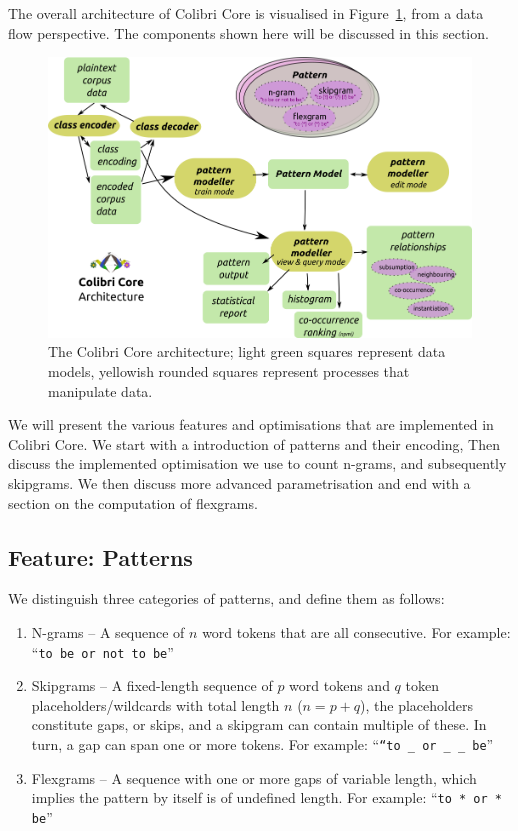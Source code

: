 The overall architecture of Colibri Core is visualised in
Figure~\ref{fig:architecture}, from a data flow perspective.  The components
shown here will be discussed in this section.

\begin{figure}[h]
\includegraphics[width=14.0cm]{../cocoarch.png}
\caption{The Colibri Core architecture; light green squares represent data models, yellowish rounded squares represent processes that manipulate data.}
\label{fig:architecture}
\end{figure}

We will present the various features and optimisations that are implemented in
Colibri Core. We start with a introduction of patterns and their encoding, Then
discuss the implemented optimisation we use to count n-grams, and subsequently
skipgrams. We then discuss more advanced parametrisation and end with a section
on the computation of flexgrams.

\subsection*{Feature: Patterns}
\label{sec:patterns}

We distinguish three categories of patterns, and define them as follows:

\begin{enumerate}
    \item N-grams -- A sequence of $n$ word tokens that are all consecutive.
        For example: ``\texttt{to be or not to be}''
    \item Skipgrams -- A fixed-length sequence of $p$ word tokens and $q$ token
        placeholders/wildcards with total length $n$ ($n=p+q$), the
        placeholders constitute gaps, or skips, and a skipgram can contain
        multiple of these. In turn, a gap can span one or more tokens. For
    example: ``\texttt{``to \_ or \_ \_ be}''
    \item Flexgrams -- A sequence with one or more gaps of variable length,
        which implies the pattern by itself is of undefined length. For example:
        ``\texttt{to * or * be}''
\end{enumerate}

